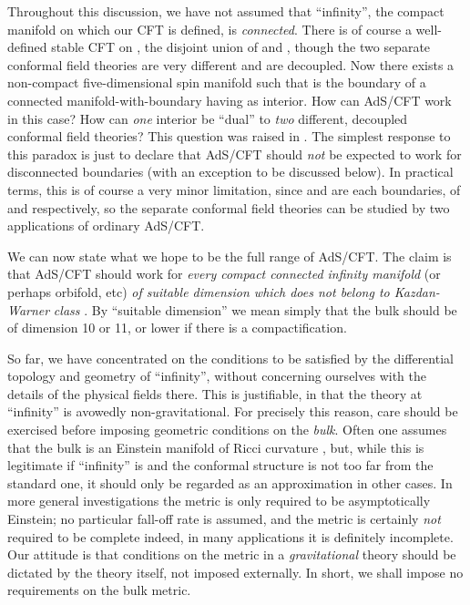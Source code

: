 \documentclass[a4paper,12pt]{article}
\theoremstyle{definition}
\renewcommand{\u}{\textit}
\renewcommand{\-}{\myHighlight{$\dfrac{\quad\enspace}{\quad}$}\coordHE{}}
\begin{document}
Throughout this discussion, we have not assumed that ``infinity'', the compact manifold on which our CFT is defined, is \u{connected}. There is of course a well-defined stable CFT on \coordHE{}, the disjoint union of \coordHE{} and \coordHE{}, though the two separate conformal field theories are very different and are decoupled.  Now there exists a non-compact five-dimensional spin manifold \coordHE{} such that \coordHE{} is the boundary of a connected manifold-with-boundary \coordHE{} having \coordHE{} as interior. How can AdS/CFT work in this case? How can \u{one} interior be ``dual'' to \u{two} different, decoupled conformal field theories? This question was raised in \cite{4}. The simplest response to this paradox is just to declare that AdS/CFT should \u{not} be expected to work for disconnected boundaries (with an exception to be discussed below). In practical terms, this is of course a very minor limitation, since \coordHE{} and \coordHE{} are each boundaries, of \coordHE{} and \coordHE{} respectively, so the separate conformal field theories can be studied by two applications of ordinary AdS/CFT. 

We can now state what we hope to be the full range of AdS/CFT. The claim is that AdS/CFT should work for \u{every compact connected infinity manifold} (or perhaps orbifold, etc) \u{of suitable dimension which does not belong to Kazdan-Warner} \u{class \coordHE{}}. By ``suitable dimension'' we mean simply that the bulk should be of dimension 10 or 11, or lower if there is a compactification.

So far, we have concentrated on the conditions to be satisfied by the differential topology and geometry of ``infinity'', without concerning ourselves with the details of the physical fields there. This is justifiable, in that the theory at ``infinity'' is avowedly non-gravitational. For precisely this reason, care should be exercised before imposing geometric conditions on the \u{bulk}. Often one assumes that the bulk is an Einstein manifold of Ricci curvature \coordHE{}, but, while this is legitimate \cite{15} if ``infinity'' is \coordHE{} and the conformal structure is not too far from the standard one, it should only be regarded as an approximation in other cases. In more general investigations \cite{16} the metric is only required to be asymptotically Einstein; no particular fall-off rate is assumed, and the metric is certainly \u{not} required to be complete \- indeed, in many applications it is definitely incomplete. Our attitude is that conditions on the metric in a \u{gravitational} theory should be dictated by the theory itself, not imposed externally. In short, we shall impose no requirements on the bulk metric.
\end{document}

